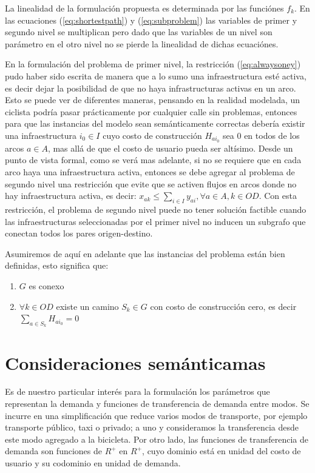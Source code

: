 \documentclass{article}
\begin{document}
  La linealidad de la formulación propuesta es determinada por las funciónes $f_k$. En las ecuaciones (\ref{eq:shortestpath}) y (\ref{eq:subproblem}) las variables de primer y segundo nivel se multiplican pero dado que las variables de un nivel son parámetro en el otro nivel no se pierde la linealidad de dichas ecuaciónes.

  En la formulación del problema de primer nivel, la restricción (\ref{eq:alwaysoney}) pudo haber sido escrita de manera que a lo sumo una infraestructura esté activa, es decir dejar la posibilidad de que no haya infrastructuras activas en un arco. Esto se puede ver de diferentes maneras, pensando en la realidad modelada, un ciclista podría pasar prácticamente por cualquier calle sin problemas, entonces para que las instancias del modelo sean semánticamente correctas debería existir una infraestructura $i_0 \in I$ cuyo costo de construcción $H_{ai_0}$ sea 0 en todos de los arcos $a \in A$, mas allá de que el costo de usuario pueda ser altísimo. Desde un punto de vista formal, como se verá mas adelante, si no se requiere que en cada arco haya una infraestructura activa, entonces se debe agregar al problema de segundo nivel una restricción que evite que se activen flujos en arcos donde no hay infraestructura activa, es decir: $x_{ak} \leq \sum_{i \in I} y_{ai}, \forall a \in A, k \in OD$. Con esta restricción, el problema de segundo nivel puede no tener solución factible cuando las infraestructuras seleccionadas por el primer nivel no inducen un subgrafo que conectan todos los pares origen-destino.

  Asumiremos de aquí en adelante que las instancias del problema están bien definidas, esto significa que:

  \begin{enumerate}
    \item {$G$ es conexo}
    \item {$\forall k \in OD$ existe un camino $S_k \in G$ con costo de construcción cero, es decir $\sum_{a \in S_k} H_{ai_0} = 0$}
  \end{enumerate}

  \section{Consideraciones semánticamas}

  Es de nuestro particular interés para la formulación los parámetros que representan la demanda y funciones de transferencia de demanda entre modos. Se incurre en una simplificación que reduce varios modos de transporte, por ejemplo transporte público, taxi o privado; a uno y consideramos la transferencia desde este modo agregado a la bicicleta. Por otro lado, las funciones de transferencia de demanda son funciones de $R^+$ en $R^+$, cuyo dominio está en unidad del costo de usuario y su codominio en unidad de demanda.
\end{document}
